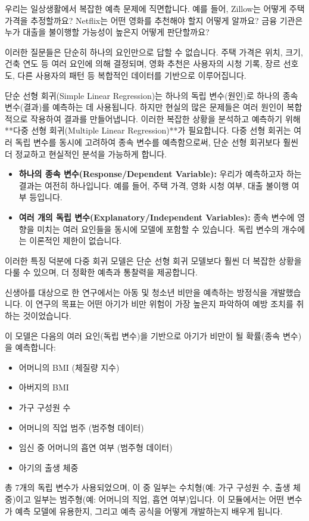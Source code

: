 \documentclass[11pt,a4paper]{article}
\begin{document}
\begin{tcolorbox}[title=\textbf{다중 선형 회귀의 필요성}]
우리는 일상생활에서 복잡한 예측 문제에 직면합니다. 예를 들어, Zillow는 어떻게 주택 가격을 추정할까요? Netflix는 어떤 영화를 추천해야 할지 어떻게 알까요? 금융 기관은 누가 대출을 불이행할 가능성이 높은지 어떻게 판단할까요?

이러한 질문들은 단순히 하나의 요인만으로 답할 수 없습니다. 주택 가격은 위치, 크기, 건축 연도 등 여러 요인에 의해 결정되며, 영화 추천은 사용자의 시청 기록, 장르 선호도, 다른 사용자의 패턴 등 복합적인 데이터를 기반으로 이루어집니다.

단순 선형 회귀(Simple Linear Regression)는 하나의 독립 변수(원인)로 하나의 종속 변수(결과)를 예측하는 데 사용됩니다. 하지만 현실의 많은 문제들은 여러 원인이 복합적으로 작용하여 결과를 만들어냅니다. 이러한 복잡한 상황을 분석하고 예측하기 위해 **다중 선형 회귀(Multiple Linear Regression)**가 필요합니다. 다중 선형 회귀는 여러 독립 변수를 동시에 고려하여 종속 변수를 예측함으로써, 단순 선형 회귀보다 훨씬 더 정교하고 현실적인 분석을 가능하게 합니다.
\end{tcolorbox}

\begin{tcolorbox}[title=\textbf{다중 선형 회귀 모델의 특징}]
\begin{itemize}
    \item \textbf{하나의 종속 변수(Response/Dependent Variable):} 우리가 예측하고자 하는 결과는 여전히 하나입니다. 예를 들어, 주택 가격, 영화 시청 여부, 대출 불이행 여부 등입니다.
    \item \textbf{여러 개의 독립 변수(Explanatory/Independent Variables):} 종속 변수에 영향을 미치는 여러 요인들을 동시에 모델에 포함할 수 있습니다. 독립 변수의 개수에는 이론적인 제한이 없습니다.
\end{itemize}
이러한 특징 덕분에 다중 회귀 모델은 단순 선형 회귀 모델보다 훨씬 더 복잡한 상황을 다룰 수 있으며, 더 정확한 예측과 통찰력을 제공합니다.
\end{tcolorbox}

\begin{examplebox}[title=\textbf{예시: 아동 비만 예측 모델}]
신생아를 대상으로 한 연구에서는 아동 및 청소년 비만을 예측하는 방정식을 개발했습니다. 이 연구의 목표는 어떤 아기가 비만 위험이 가장 높은지 파악하여 예방 조치를 취하는 것이었습니다.

이 모델은 다음의 여러 요인(독립 변수)을 기반으로 아기가 비만이 될 확률(종속 변수)을 예측합니다:
\begin{itemize}
    \item 어머니의 BMI (체질량 지수)
    \item 아버지의 BMI
    \item 가구 구성원 수
    \item 어머니의 직업 범주 (범주형 데이터)
    \item 임신 중 어머니의 흡연 여부 (범주형 데이터)
    \item 아기의 출생 체중
\end{itemize}
총 7개의 독립 변수가 사용되었으며, 이 중 일부는 수치형(예: 가구 구성원 수, 출생 체중)이고 일부는 범주형(예: 어머니의 직업, 흡연 여부)입니다. 이 모듈에서는 어떤 변수가 예측 모델에 유용한지, 그리고 예측 공식을 어떻게 개발하는지 배우게 됩니다.
\end{examplebox}
\end{document}
